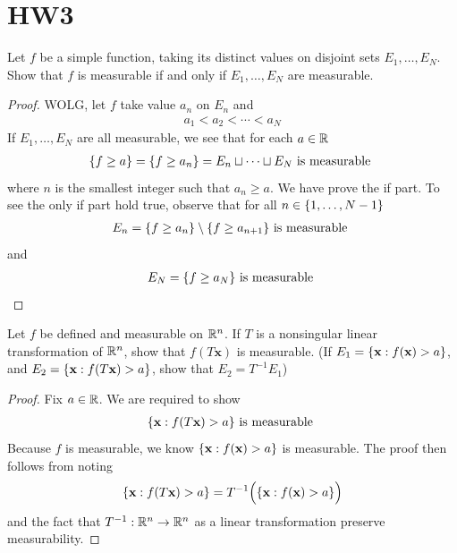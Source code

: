 \documentclass{report}
\begin{document}
\section{HW3}
\begin{question}{}{}
Let $f$ be a simple function, taking its distinct values on disjoint sets $E_1,\dots , E_N$. Show that $f$ is measurable if and only if $E_1,\dots ,E_N$ are measurable. 
\end{question}
\begin{proof}
WOLG, let $f$ take value  $a_n$  on  $E_n$ and
\begin{align*}
a_1<a_2<\cdots < a_N
\end{align*}
If $E_1,\dots ,E_N$ are all measurable, we see that for each $a\in\mathbb{R} $  
\begin{align*}
\{ f\geq a \}=\{ f\geq a_n \}=E_n \sqcup \cdots \sqcup E_N\text{ is measurable  }
\end{align*}
where $n$ is the smallest integer such that  $a_n\geq a$. We have prove the if part. To see the only if part hold true, observe that for all $n\in \{ 1,\dots ,N-1 \}$ 
\begin{align*}
E_n=\{ f\geq a_n \}\setminus \{ f\geq a_{n+1} \}\text{ is measurable }
\end{align*}
and 
\begin{align*}
E_N=\{ f\geq a_N \}\text{ is measurable }
\end{align*}
\end{proof}
\begin{question}{}{}
Let $f$ be defined and measurable on $\mathbb{R}^n$. If  $T$ is a nonsingular linear transformation of $\mathbb{R}^n$, show that  $f(T\textbf{x})$ is measurable. (If $E_1=\{ \textbf{x}:f(\textbf{x})>a \}$, and $E_2=\{ \textbf{x}:f(T\textbf{x})>a \}$, show that $E_2=T^{-1}E_1$) 
\end{question}
\begin{proof}
Fix $a\in\mathbb{R}$. We are required to show 
\begin{align*}
\{ \textbf{x}:f(T\textbf{x})>a \}\text{ is measurable }
\end{align*}
Because $f$ is measurable, we know $\{ \textbf{x}:f(\textbf{x})>a \}$ is measurable. The proof then follows from noting 
\begin{align*}
\{ \textbf{x}:f(T\textbf{x})>a \}= T^{-1}\Big(\{ \textbf{x}:f(\textbf{x})>a \} \Big)
\end{align*}
and the fact that $T^{-1}:\mathbb{R}^n\rightarrow \mathbb{R}^n$ as a linear transformation preserve measurability. 
\end{proof}
\end{document}
